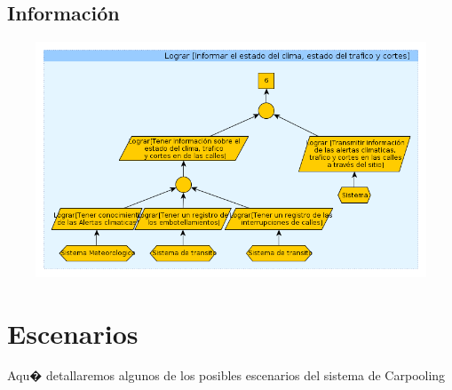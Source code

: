 \documentclass[a4paper,titlepage,10pt]{article}
\begin{document}
\subsection{Informaci\'on}
\includegraphics[height=7cm,width=19.5cm]{imagenes/InformacionDelClimayViajes.png}



\newpage

\section{Escenarios} %
Aqu� detallaremos algunos de los posibles escenarios del sistema de Carpooling
\end{document}
